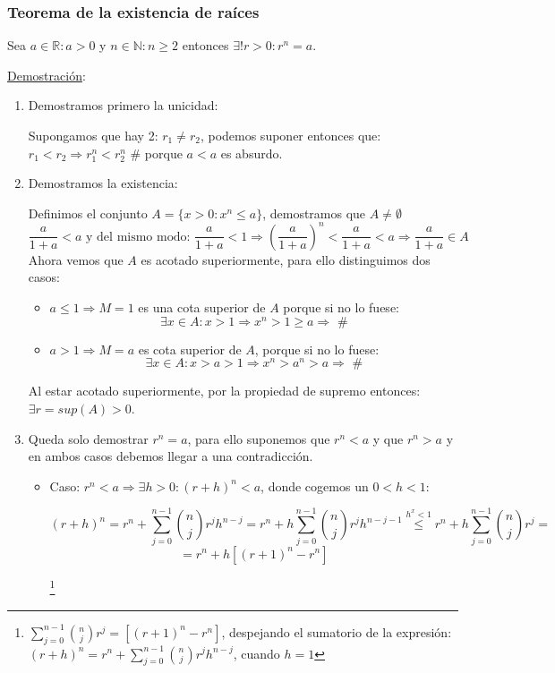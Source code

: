 \documentclass[10pt,a4paper,openright]{book}
\begin{document}
\subsubsection*{Teorema de la existencia de raíces}
Sea $a\in \mathbb R: a>0$ y $n\in \mathbb N: n\geq 2$ entonces $\exists! r>0: r^n=a$.\par
\underline{Demostración}:\par
\begin{enumerate}
\item Demostramos primero la unicidad:\par
Supongamos que hay 2: $r_1\neq r_2$, podemos suponer entonces que: $r_1<r_2\Rightarrow r_1^n<r_2^n$ \# porque $a<a$ es absurdo.

\item Demostramos la existencia:\par 
Definimos el conjunto $A=\{x>0: x^n\leq a\}$, demostramos que $A\neq \emptyset$
$$\frac{a}{1+a}<a\mbox{ y del mismo modo: }\frac{a}{1+a}<1\Rightarrow \left(\frac{a}{1+a}\right)^n<\frac{a}{1+a}<a\Rightarrow \frac{a}{1+a}\in A$$
Ahora vemos que $A$ es acotado superiormente, para ello distinguimos dos casos:
	\begin{itemize}
	\item $a\leq 1\Rightarrow M=1$ es una cota superior de $A$ porque si no lo fuese:
$$\exists x\in A: x>1\Rightarrow x^n>1\geq a\Rightarrow \mbox{ \#}$$

	\item  $a>1\Rightarrow M=a$ es cota superior de $A$, porque si no lo fuese:
$$\exists x\in A: x>a>1 \Rightarrow x^n>a^n>a\Rightarrow\mbox{ \#}$$
	\end{itemize}

Al estar acotado superiormente, por la propiedad de supremo entonces: $\exists r=sup(A)>0$.
\item Queda solo demostrar $r^n=a$, para ello suponemos que $r^n<a$ y que $r^n>a$ y en ambos casos debemos llegar a una contradicción.
	\begin{itemize}
	\item Caso: $r^n<a\Rightarrow \exists h>0: (r+h)^n<a$, donde cogemos un $0<h<1$:
	
$$(r+h)^n=r^n+\sum_{j=0}^{n-1}\binom{n}{j}r^jh^{n-j}=r^n+h\sum_{j=0}^{n-1}\binom{n}{j}r^jh^{n-j-1}\stackrel{h^x<1}{\leq}r^n+h\sum_{j=0}^{n-1}\binom{n}{j}r^j=$$
$$=r^n+h\left[(r+1)^n-r^n\right]$$

\footnote{$\sum_{j=0}^{n-1}\binom{n}{j}r^j=\left[(r+1)^n-r^n\right]$, despejando el sumatorio de la expresión: $(r+h)^n=r^n+\sum_{j=0}^{n-1}\binom{n}{j}r^jh^{n-j}$, cuando $h=1$}


\end{itemize}
\end{enumerate}
\end{document}
